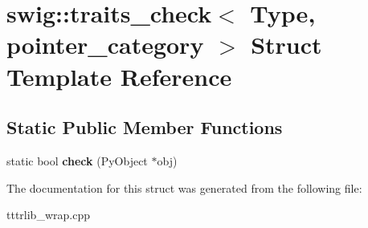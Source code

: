 \hypertarget{structswig_1_1traits__check_3_01_type_00_01pointer__category_01_4}{}\section{swig\+:\+:traits\+\_\+check$<$ Type, pointer\+\_\+category $>$ Struct Template Reference}
\label{structswig_1_1traits__check_3_01_type_00_01pointer__category_01_4}
\subsection*{Static Public Member Functions}
\begin{DoxyCompactItemize}
\item 
\mbox{\label{structswig_1_1traits__check_3_01_type_00_01pointer__category_01_4_ae3cc14b7411d171e1cf97aabd9ff92c5}} 
static bool {\bfseries check} (Py\+Object $\ast$obj)
\end{DoxyCompactItemize}


The documentation for this struct was generated from the following file\+:\begin{DoxyCompactItemize}
\item 
tttrlib\+\_\+wrap.\+cpp\end{DoxyCompactItemize}
